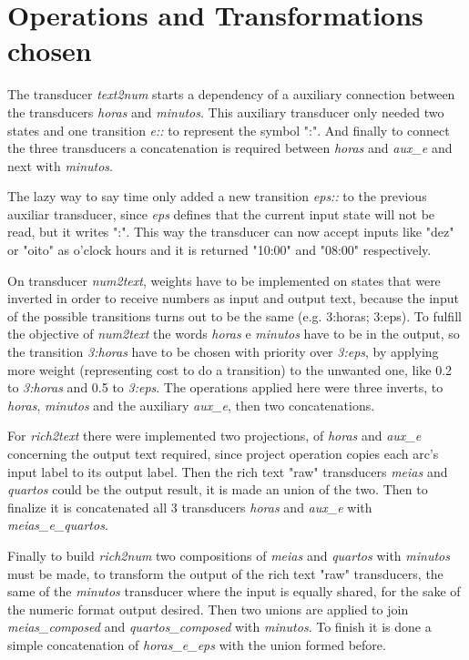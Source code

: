 \documentclass{sigchi}
\begin{document}
\section{Operations and Transformations chosen}

The transducer \emph{text2num} starts a dependency of a auxiliary connection between the transducers \emph{horas} and \emph{minutos}. This auxiliary transducer only needed two states and one transition \emph{e::} to represent the symbol ":". And finally to connect the three transducers a concatenation is required between \emph{horas} and \emph{aux\_e} and next with \emph{minutos}.

The lazy way to say time only added a new transition \emph{eps::} to the previous auxiliar transducer, since \emph{eps} defines that the current input state will not be read, but it writes ":". This way the transducer can now accept inputs like "dez" or "oito" as o'clock hours and it is returned "10:00" and "08:00" respectively.

On transducer \emph{num2text}, weights have to be implemented on states that were inverted in order to receive numbers as input and output text, because the input of the possible transitions turns out to be the same (e.g. 3:horas; 3:eps). To fulfill the objective of \emph{num2text} the words \emph{horas} e \emph{minutos} have to be in the output, so the transition \emph{3:horas} have to be chosen with priority over \emph{3:eps}, by applying more weight (representing cost to do a transition) to the unwanted one, like 0.2 to  \emph{3:horas} and 0.5 to \emph{3:eps}. The operations applied here were three inverts, to \emph{horas}, \emph{minutos} and the auxiliary \emph{aux\_e}, then two concatenations.

For \emph{rich2text} there were implemented two projections, of \emph{horas} and \emph{aux\_e} concerning the output text required, since project operation copies each arc's input label to its output label. Then the rich text "raw" transducers \emph{meias} and \emph{quartos} could be the output result, it is made an union of the two. Then to finalize it is concatenated all 3 transducers \emph{horas} and \emph{aux\_e} with \emph{meias\_e\_quartos}.

Finally to build \emph{rich2num} two compositions of \emph{meias} and \emph{quartos} with \emph{minutos} must be made, to transform the output of the rich text "raw" transducers, the same of the \emph{minutos} transducer where the input is equally shared, for the sake of the numeric format output desired. Then two unions are applied to join  \emph{meias\_composed} and \emph{quartos\_composed} with \emph{minutos}. To finish it is done a simple concatenation of \emph{horas\_e\_eps} with the union formed before.
\end{document}
